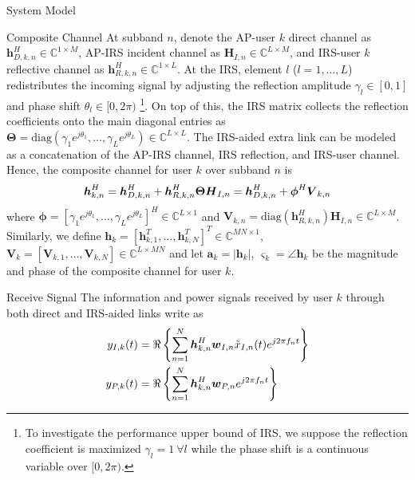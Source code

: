 \documentclass{IEEEtran}
\begin{document}
\begin{section}{System Model}
	\begin{subsection}{Composite Channel}
		At subband $n$, denote the AP-user $k$ direct channel as $\boldsymbol{h}_{D,k,n}^H \in \mathbb{C}^{1 \times M}$, AP-IRS incident channel as $\boldsymbol{H}_{I,n} \in \mathbb{C}^{L \times M}$, and IRS-user $k$ reflective channel as $\boldsymbol{h}_{R,k,n}^H \in \mathbb{C}^{1 \times L}$. At the IRS, element $l$ ($l=1,\dots,L$) redistributes the incoming signal by adjusting the reflection amplitude $\gamma_l \in [0,1]$ and phase shift $\theta_l \in [0,2\pi)$ \footnote{To investigate the performance upper bound of IRS, we suppose the reflection coefficient is maximized $\gamma_l=1 \ \forall l$ while the phase shift is a continuous variable over $[0,2\pi)$.}. On top of this, the IRS matrix collects the reflection coefficients onto the main diagonal entries as $\boldsymbol{\Theta} = \mathrm{diag}(\gamma_1 e^{j \theta_1}, \dots, \gamma_L e^{j \theta_L}) \in \mathbb{C}^{L \times L}$. The IRS-aided extra link can be modeled as a concatenation of the AP-IRS channel, IRS reflection, and IRS-user channel. Hence, the composite channel for user $k$ over subband $n$ is
		\begin{equation}\label{eq:h_{k,n}}
			\boldsymbol{h}_{k,n}^H = \boldsymbol{h}_{D,k,n}^H + \boldsymbol{h}_{R,k,n}^H \boldsymbol{\Theta} \boldsymbol{H}_{I,n} = \boldsymbol{h}_{D,k,n}^H + \boldsymbol{\phi}^H \boldsymbol{V}_{k,n}
		\end{equation}
		where $\boldsymbol{\phi}=[\gamma_1 e^{j \theta_1}, \dots, \gamma_L e^{j \theta_L}]^H \in \mathbb{C}^{L \times 1}$ and $\boldsymbol{V}_{k,n}=\mathrm{diag}(\boldsymbol{h}_{R,k,n}^H)\boldsymbol{H}_{I,n} \in \mathbb{C}^{L \times M}$. Similarly, we define $\boldsymbol{h}_k=[\boldsymbol{h}_{k,1}^T,\dots,\boldsymbol{h}_{k,N}^T]^T \in \mathbb{C}^{MN \times 1}$, $\boldsymbol{V}_k=[\boldsymbol{V}_{k,1},\dots,\boldsymbol{V}_{k,N}] \in \mathbb{C}^{L \times MN}$ and let $\boldsymbol{a}_{k}=\lvert \boldsymbol{h}_{k} \rvert$, $\boldsymbol{\varsigma}_{k}=\angle{\boldsymbol{h}_{k}}$ be the magnitude and phase of the composite channel for user $k$.
	\end{subsection}

	\begin{subsection}{Receive Signal}
		The information and power signals received by user $k$ through both direct and IRS-aided links write as
		\begin{align}\label{eq:y_{I/P,k}}
			y_{I,k}(t) & = \Re\left\{\sum_{n=1}^N{\boldsymbol{h}_{k,n}^H}{\boldsymbol{w}_{I,n}\tilde{x}_{I,n}(t)}{e^{j2{\pi}{f_n}{t}}}\right\}\\
			y_{P,k}(t) & = \Re\left\{\sum_{n=1}^N{\boldsymbol{h}_{k,n}^H}\boldsymbol{w}_{P,n}{e^{j2{\pi}{f_n}{t}}}\right\}
		\end{align}
	\end{subsection}


\end{section}
\end{document}
